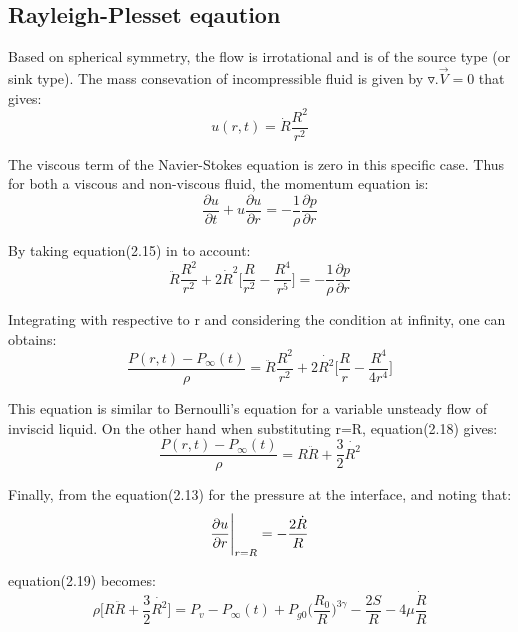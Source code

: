 \subsection{Rayleigh-Plesset eqaution}
Based on spherical symmetry, the flow is irrotational and is of the
source type (or sink type). The mass consevation of incompressible
fluid is given by $\triangledown.{\vec{V}}=0$ that gives:
\begin{equation}
u(r,t)=\dot{R}\frac{{R}^2}{{r}^2}
\end{equation}

The viscous term of the Navier-Stokes equation is zero in this
specific case. Thus for both a viscous and non-viscous fluid, the
momentum equation is:
\begin{equation}
{\frac{\partial u}{\partial t}}+u{\frac{\partial u}{\partial r}}=-{\frac{1}{\rho}}{\frac{\partial p}{\partial r}}
\end{equation}

By taking equation(2.15) in to account:
\begin{equation}
{\ddot{R}}{\frac{{R}^2}{r^2}}+2{{\dot{R}}^2}\Bigg[{\frac{R}{r^2}}-{\frac{R^4}{r^5}}\Bigg]=-{\frac{1}{\rho}}{\frac{\partial{p}}{\partial{r}}}
\end{equation}

Integrating with respective to r and considering the condition at
infinity, one can obtains:
\begin{equation}
{\frac{P(r,t)-{P_{\infty}}(t)}{\rho}}={\ddot{R}}{\frac{{R}^2}{r^2}}+2{\dot{R^2}}{\Bigg[{\frac{R}{r}}-{\frac{R^4}{4r^4}}\Bigg]}
\end{equation}

This equation is similar to Bernoulli's equation for a variable
unsteady flow of inviscid liquid. On the other hand when substituting
r=R, equation(2.18) gives:
\begin{equation}
{\frac{P(r,t)-{P_{\infty}}(t)}{\rho}}=R{\ddot{R}}+{\frac{3}{2}}{\dot{R^2}}
\end{equation}

Finally, from the equation(2.13) for the pressure at the interface,
and noting that:
\begin{equation}
{{\frac{\partial u}{\partial r}}\Bigg{\vert}_{r=R}}=-{\frac{2\dot R}{R}}
\end{equation}

equation(2.19) becomes:
\begin{equation}
 {\rho \Bigg[{R{\ddot{R}} + {\frac{3}{2}}{\dot{R^2}}}\Bigg]} = {P_v} -
 {{P_{\infty}}(t)}+{P_{g0}}{\Bigg({\frac{R_0}{R}\Bigg)^{3\gamma}}} -
 {\frac{2S}{R}} - 4\mu{\frac{\dot R}{R}}
\end{equation}

